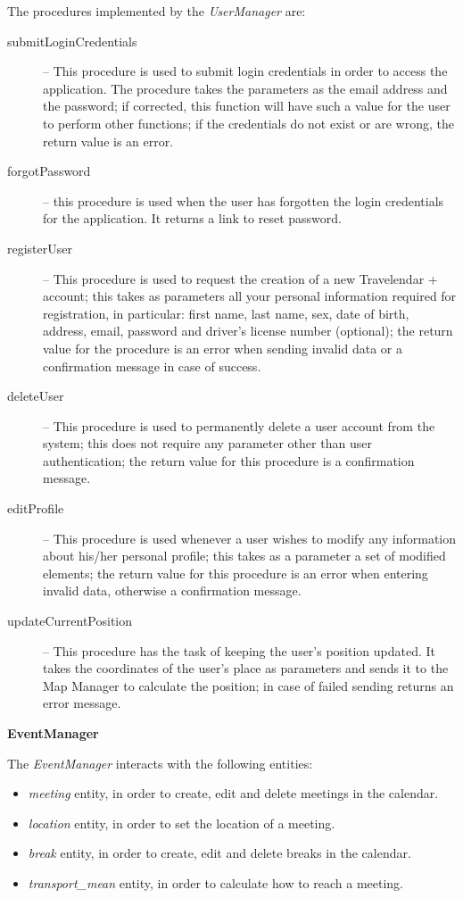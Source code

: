 \documentclass{article}
\begin{document}
	\bigskip
	The procedures implemented by the \textit{UserManager} are:
	\begin{description}
	\item [submitLoginCredentials] -- This procedure is used to submit login credentials in order to access the application. The procedure takes the parameters as the email address and the password; if corrected, this function will have such a value for the user to perform other functions; if the credentials do not exist or are wrong, the return value is an error.
	\item [forgotPassword] -- this procedure is used when the user has forgotten the login credentials for the application. It returns a link to reset password.
	\item [registerUser] -- This procedure is used to request the creation of a new Travelendar + account; this takes as parameters all your personal information required for registration, in particular: first name, last name, sex, date of birth, address, email, password and driver's license number (optional); the return value for the procedure is an error when sending invalid data or a confirmation message in case of success.
	\item [deleteUser] -- This procedure is used to permanently delete a user account from the system; this does not require any parameter other than user authentication; the return value for this procedure is a confirmation message.
	\item [editProfile] -- This procedure is used whenever a user wishes to modify any information about his/her personal profile; this takes as a parameter a set of modified elements; the return value for this procedure is an error when entering invalid data, otherwise a confirmation message.
	\item [updateCurrentPosition] -- This procedure has the task of keeping the user's position updated. It takes the coordinates of the user’s place as parameters and sends it to the Map Manager to calculate the position; in case of failed sending returns an error message.
	\end{description}

	\bigskip
	\noindent
	\textbf{EventManager}

	\bigskip
	\noindent
	The \textit{EventManager} interacts with the following entities:
	\begin{itemize}
	\item \textit{meeting} entity, in order to create, edit and delete meetings in the calendar.
	\item \textit{location} entity, in order to set the location of a meeting.
	\item \textit{break} entity, in order to create, edit and delete breaks in the calendar.
	\item \textit{transport\_mean} entity, in order to calculate how to reach a meeting.
	\end{itemize}
\end{document}
